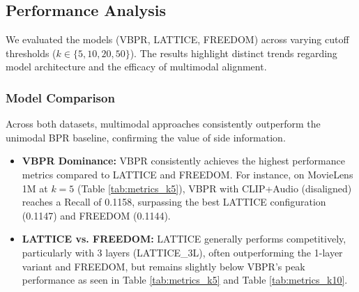 \subsection{Performance Analysis}
We evaluated the models (VBPR, LATTICE, FREEDOM) across varying cutoff thresholds ($k \in \{5, 10, 20, 50\}$). The results highlight distinct trends regarding model architecture and the efficacy of multimodal alignment.

\subsubsection{Model Comparison}
Across both datasets, multimodal approaches consistently outperform the unimodal BPR baseline, confirming the value of side information.
\begin{itemize}
    \item \textbf{VBPR Dominance:} VBPR consistently achieves the highest performance metrics compared to LATTICE and FREEDOM. For instance, on MovieLens 1M at $k=5$ (Table \ref{tab:metrics_k5}), VBPR with CLIP+Audio (disaligned) reaches a Recall of 0.1158, surpassing the best LATTICE configuration (0.1147) and FREEDOM (0.1144).
    \item \textbf{LATTICE vs. FREEDOM:} LATTICE generally performs competitively, particularly with 3 layers (LATTICE\_3L), often outperforming the 1-layer variant and FREEDOM, but remains slightly below VBPR's peak performance as seen in Table \ref{tab:metrics_k5} and Table \ref{tab:metrics_k10}.
\end{itemize}

